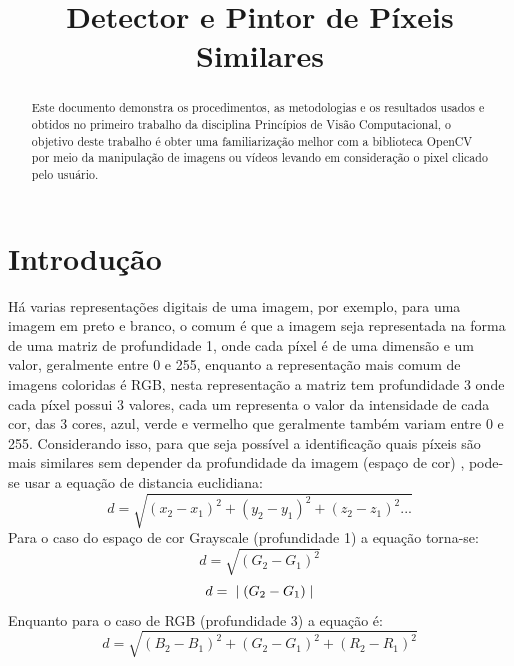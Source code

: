 \documentclass{bmvc2k}
\title{Detector e Pintor de Píxeis Similares}
\begin{document}
\maketitle

\begin{abstract}
    Este documento demonstra os procedimentos, as metodologias e os resultados usados e obtidos no primeiro trabalho da disciplina Princípios de Visão Computacional, o objetivo deste trabalho é obter uma familiarização melhor com a biblioteca OpenCV \cite{opencv_library} por meio da manipulação de imagens ou vídeos levando em consideração o pixel clicado pelo usuário.
\end{abstract}

\section{Introdução}
\label{sec:intro}
    Há varias representações digitais de uma imagem, por exemplo, para uma imagem em preto e branco, o comum é que a imagem seja representada na forma de uma matriz de profundidade 1, onde cada píxel é de uma dimensão e um valor, geralmente entre 0 e 255, enquanto a representação mais comum de imagens coloridas é RGB, nesta representação a matriz tem profundidade 3 onde cada píxel possui 3 valores, cada um representa o valor da intensidade de cada cor, das 3 cores, azul, verde e vermelho que geralmente também variam entre 0 e 255. Considerando isso, para que seja possível a identificação quais píxeis são mais similares sem depender da profundidade da imagem (espaço de cor) , pode-se usar a equação de distancia euclidiana:
    \begin{equation}\label{eq:geneuc}
        d = \sqrt{(x_2 - x_1)^2 + (y_2 - y_1)^2 + (z_2 - z_1)^2...}
    \end{equation} 
    Para o caso do espaço de cor Grayscale (profundidade 1) a equação torna-se:
    \begin{equation}\label{eq:gen1d}
        d = \sqrt{(G_2 - G_1)^2}
    \end{equation}
    \vspace{-3mm}
    \begin{equation}\label{eq:1dsimp}
        d =\hspace{2mm} \mid(G_2 - G_1)\mid
    \end{equation}
    \vspace{1mm}
    Enquanto para o caso de RGB (profundidade 3) a equação é:
    \begin{equation}\label{eq:rgbeucgen}
        d = \sqrt{(B_2 - B_1)^2 + (G_2 - G_1)^2 + (R_2 - R_1)^2}
    \end{equation}
\end{document}
